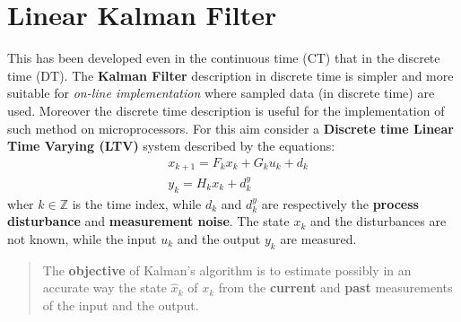 \section{Linear Kalman Filter}
This has been developed even in the continuous time (CT) that in the discrete time (DT). The \textbf{Kalman Filter} description in discrete time is simpler and more suitable for \textit{on-line implementation} where sampled data (in discrete time) are used. Moreover the discrete time description is useful for the implementation of such method on microprocessors. For this aim consider a \textbf{Discrete time Linear Time Varying (LTV)} system described by the equations:
\begin{equation}
    \begin{aligned}
        &x_{k+1} = F_k x_k + G_k u_k + d_k\\
        &y_k = H_k x_k + d_k^y
    \end{aligned}
\end{equation}
wher $k\in\mathbb{Z}$ is the time index, while $d_k$ and $d_k^y$ are respectively the \textbf{process disturbance} and \textbf{measurement noise}. The state $x_k$ and the disturbances are not known, while the input  $u_k$ and the output $y_k$ are measured.\\
{\large{
    \color{red}
    \begin{quotation}
        The \textbf{objective} of Kalman's algorithm is to estimate possibly in an accurate way the state $\hat{x}_k$ of $x_k$ from the \textbf{current} and \textbf{past} measurements of the input and the output. 
    \end{quotation}
}}

